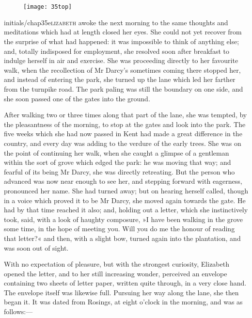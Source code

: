 \chapter[Chapter \thechapter]{}
	
	\begin{figure}[t!]
\centering
\texttt{[image: 35top]}
\end{figure}


\lettrine[lines=6,image=true]{initials/chap35e}{lizabeth}  awoke the next morning to the same thoughts and meditations which had at length closed her eyes. She could not yet recover from the surprise of what had happened: it was impossible to think of anything else; and, totally indisposed for employment, she resolved soon after breakfast to indulge herself in air and exercise. She was proceeding directly to her favourite walk, when the recollection of Mr Darcy's sometimes coming there stopped her, and instead of entering the park, she turned up the lane which led her farther from the turnpike road. The park paling was still the boundary on one side, and she soon passed one of the gates into the ground.

After walking two or three times along that part of the lane, she was tempted, by the pleasantness of the morning, to stop at the gates and look into the park. The five weeks which she had now passed in Kent had made a great difference in the country, and every day was adding to the verdure of the early trees. She was on the point of continuing her walk, when she caught a glimpse of a gentleman within the sort of grove which edged the park: he was moving that way; and fearful of its being Mr Darcy, she was directly retreating. But the person who advanced was now near enough to see her, and stepping forward with eagerness, pronounced her name. She had turned away; but on hearing herself called, though in a voice which proved it to be Mr Darcy, she moved again towards the gate. He had by that time reached it also; and, holding out a letter, which she instinctively took, said, with a look of haughty composure, »I have been walking in the grove some time, in the hope of meeting you. Will you do me the honour of reading that letter?« and then, with a slight bow, turned again into the plantation, and was soon out of sight.

With no expectation of pleasure, but with the strongest curiosity, Elizabeth opened the letter, and to her still increasing wonder, perceived an envelope containing two sheets of letter paper, written quite through, in a very close hand. The envelope itself was likewise full. Pursuing her way along the lane, she then began it. It was dated from Rosings, at eight o'clock in the morning, and was as follows:—

